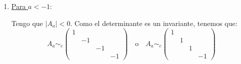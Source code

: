 \begin{ejercicio}
\begin{enumerate}
\begin{enumerate}
            \begin{comment}
            Sea ahora $U=\cc{L}\{2e_2-e_3, e_4\}$.
            \begin{equation*}
                g(2e_2-e_3, 2e_2-e_3) = 4a + a -2\cdot 2 = -4 \qquad g(e_4, e_4)=1 \qquad g(e_2-e_3, e_4) = g(e_2, e_4) - g(e_3, e_4) = 0-1 = -1
            \end{equation*}
            Por tanto,
            \begin{equation*}
                M(g, \cc{B}') = \left(\begin{array}{cc}
                    -4 & -1 \\
                    -1 & 1
                \end{array} \right)
            \end{equation*}
            \end{comment}

            \item \underline{Para $a<-1$}:

            Tengo que $|A_{a}|<0$. Como el determinante es un invariante, tenemos que:
            \begin{equation*}
                A_a \sim_c \left( \begin{array}{cccc}
                1 &&& \\
                &-1&& \\
                &&-1&\\
                &&&-1
            \end{array} \right)
            \quad \text{o} \quad
            A_a \sim_c \left( \begin{array}{cccc}
                1 &&& \\
                &1&& \\
                &&1&\\
                &&&-1
            \end{array} \right)
            \end{equation*}            
            

\end{enumerate}
\end{enumerate}
\end{ejercicio}
